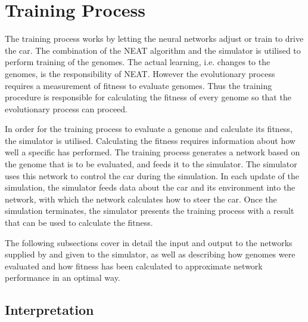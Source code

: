 \section{Training Process}
The training process works by letting the neural networks adjust or train to drive the car. The combination of the NEAT algorithm and the simulator is utilised to perform training of the genomes. The actual learning, i.e. changes to the genomes, is the responsibility of NEAT. However the evolutionary process requires a measurement of fitness to evaluate genomes. Thus the training procedure is responsible for calculating the fitness of every genome so that the evolutionary process can proceed. 

In order for the training process to evaluate a genome and calculate its fitness, the simulator is utilised. Calculating the fitness requires information about how well a specific has performed. The training process generates a network based on the genome that is to be evaluated, and feeds it to the simulator. The simulator uses this network to control the car during the simulation. In each update of the simulation, the simulator feeds data about the car and its environment into the network, with which the network calculates how to steer the car. Once the simulation terminates, the simulator presents the training process with a result that can be used to calculate the fitness.

The following subsections cover in detail the input and output to the networks supplied by and given to the simulator, as well as describing how genomes were evaluated and how fitness has been calculated to approximate network performance in an optimal way.

\subsection{Interpretation}
\label{method:interpretation}

